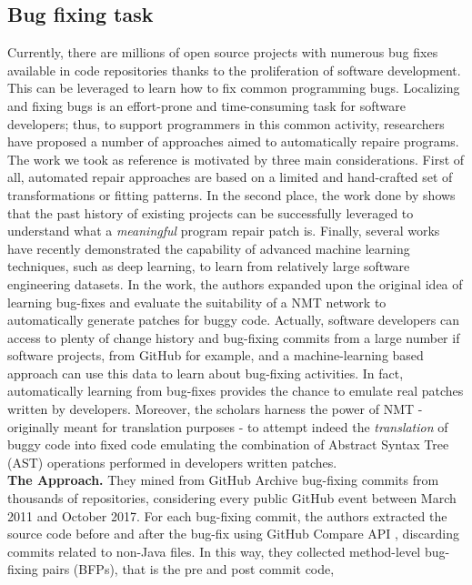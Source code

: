 \subsection{Bug fixing task}
Currently, there are millions of open source projects with numerous bug fixes available in code repositories
thanks to the proliferation of software development. This can be leveraged to learn how to fix common programming bugs. 
Localizing and fixing bugs is an effort-prone and time-consuming task for software developers;
thus, to support programmers in this common activity, researchers have proposed a number of approaches aimed to automatically repaire programs.
The work we took as reference is motivated by three main considerations. 
First of all, automated repair approaches are based on a limited and hand-crafted
set of transformations or fitting patterns. 
In the second place, the work done by \cite{le2016history} shows that the past history of 
existing projects can be successfully leveraged to understand what a \textit{meaningful} program repair patch is. 
Finally, several works have recently demonstrated the capability of advanced machine learning techniques, such as deep learning, to learn from relatively large software engineering
datasets. 
In the work, the authors expanded upon the original idea of learning bug-fixes and evaluate the suitability of a NMT network to automatically
generate patches for buggy code.
Actually, software developers can access to plenty of change history and 
bug-fixing commits from a large number if software projects, from GitHub for example, and
a machine-learning based approach can use this data to learn about 
bug-fixing activities. In fact, automatically learning from bug-fixes provides the 
chance to emulate real patches written by developers. 
Moreover, the scholars harness the power of NMT - originally meant for translation purposes -
to attempt indeed the \textit{translation} of buggy code into fixed code emulating 
the combination of Abstract Syntax Tree (AST) operations performed in developers written patches.\\
\newline
\textbf{The Approach.} They mined from GitHub Archive \cite{} bug-fixing commits 
from thousands of repositories, considering every public GitHub event between March 2011 and 
October 2017. For each bug-fixing commit, the authors extracted the source code before and 
after the bug-fix using GitHub Compare API \cite{}, discarding commits related to non-Java files.
In this way, they 
collected method-level bug-fixing pairs (BFPs), that is the pre and post commit code, 
